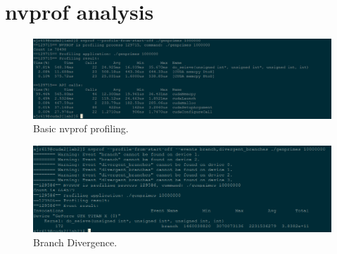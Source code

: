 \documentclass{article}
\begin{document}
\section{nvprof analysis}
\begin{figure}[ht!]
  \centering
  \includegraphics[width=1\textwidth]{nvprof}
  \caption{Basic nvprof profiling.\label{fig:speedup}}
\end{figure}

\begin{figure}[ht!]
  \centering
  \includegraphics[width=1\textwidth]{branch_divergence}
  \caption{Branch Divergence.\label{fig:speedup}}
\end{figure}
\end{document}
